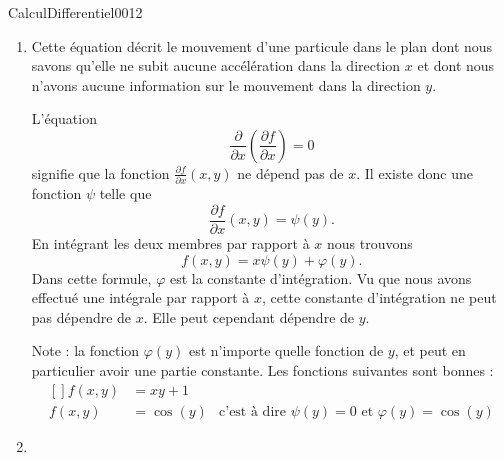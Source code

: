 \begin{corrige}{CalculDifferentiel0012}

	\begin{enumerate}
		\item
			Cette équation décrit le mouvement d'une particule dans le plan dont nous savons qu'elle ne subit aucune accélération dans la direction $x$ et dont nous n'avons aucune information sur le mouvement dans la direction $y$.

			L'équation
			\begin{equation}
				\frac{ \partial  }{ \partial x }\left( \frac{ \partial f }{ \partial x } \right)=0
			\end{equation}
			signifie que la fonction $\frac{ \partial f }{ \partial x }(x,y)$ ne dépend pas de $x$. Il existe donc une fonction $\psi$ telle que 
			\begin{equation}
				\frac{ \partial f }{ \partial x }(x,y)=\psi(y).
			\end{equation}
			En intégrant les deux membres par rapport à $x$ nous trouvons
			\begin{equation}
				f(x,y)=x\psi(y)+\varphi(y).
			\end{equation}
			Dans cette formule, $\varphi$ est la constante d'intégration. Vu que nous avons effectué une intégrale par rapport à $x$, cette constante d'intégration ne peut pas dépendre de $x$. Elle peut cependant dépendre de $y$.

			Note : la fonction $\varphi(y)$ est n'importe quelle fonction  de $y$, et peut en particulier avoir une partie constante. Les fonctions suivantes sont bonnes :
			\begin{equation}
				\begin{aligned}[]
					f(x,y)&=xy+1\\
					f(x,y)&=\cos(y)	&\text{c'est à  dire $\psi(y)=0$ et $\varphi(y)=\cos(y)$}
				\end{aligned}
			\end{equation}
		
		\item


\end{enumerate}
\end{corrige}
